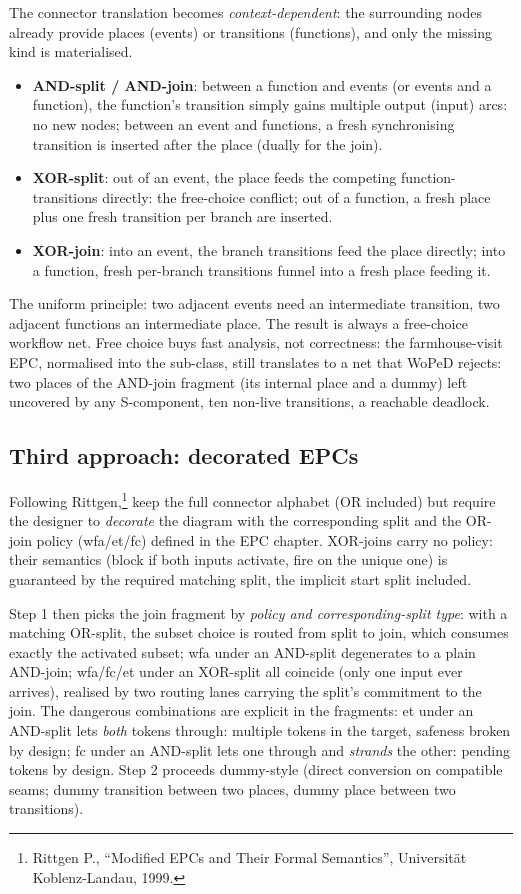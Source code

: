 The connector translation becomes \emph{context-dependent}: the surrounding nodes already provide places (events) or transitions (functions), and only the missing kind is materialised.
\begin{itemize}
  \item \textbf{AND-split / AND-join}: between a function and events (or events and a function), the function's transition simply gains multiple output (input) arcs: no new nodes; between an event and functions, a fresh synchronising transition is inserted after the place (dually for the join).
  \item \textbf{XOR-split}: out of an event, the place feeds the competing function-transitions directly: the free-choice conflict; out of a function, a fresh place plus one fresh transition per branch are inserted.
  \item \textbf{XOR-join}: into an event, the branch transitions feed the place directly; into a function, fresh per-branch transitions funnel into a fresh place feeding it.
\end{itemize}
The uniform principle: two adjacent events need an intermediate transition, two adjacent functions an intermediate place. The result is always a free-choice workflow net. Free choice buys fast analysis, not correctness: the farmhouse-visit EPC, normalised into the sub-class, still translates to a net that WoPeD rejects: two places of the AND-join fragment (its internal place and a dummy) left uncovered by any S-component, ten non-live transitions, a reachable deadlock.

\subsection{Third approach: decorated EPCs}

Following Rittgen,\footnote{Rittgen P., ``Modified EPCs and Their Formal Semantics'', Universit\"at Koblenz-Landau, 1999.} keep the full connector alphabet (OR included) but require the designer to \emph{decorate} the diagram with the corresponding split and the OR-join policy (\textsf{wfa}/\textsf{et}/\textsf{fc}) defined in the EPC chapter. XOR-joins carry no policy: their semantics (block if both inputs activate, fire on the unique one) is guaranteed by the required matching split, the implicit start split included.

Step 1 then picks the join fragment by \emph{policy and corresponding-split type}: with a matching OR-split, the subset choice is routed from split to join, which consumes exactly the activated subset; \textsf{wfa} under an AND-split degenerates to a plain AND-join; \textsf{wfa}/\textsf{fc}/\textsf{et} under an XOR-split all coincide (only one input ever arrives), realised by two routing lanes carrying the split's commitment to the join. The dangerous combinations are explicit in the fragments: \textsf{et} under an AND-split lets \emph{both} tokens through: multiple tokens in the target, safeness broken by design; \textsf{fc} under an AND-split lets one through and \emph{strands} the other: pending tokens by design. Step 2 proceeds dummy-style (direct conversion on compatible seams; dummy transition between two places, dummy place between two transitions).

